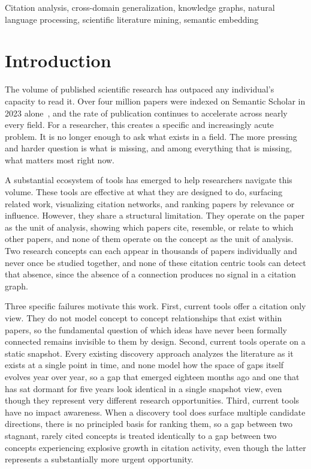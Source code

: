 \documentclass{ieeeaccess}
\begin{document}
\begin{keywords}
Citation analysis, cross-domain generalization, knowledge graphs, natural language processing, scientific literature mining, semantic embedding
\end{keywords}

\titlepgskip=-15pt

\maketitle

\section{Introduction}
\label{sec:introduction}


The volume of published scientific research has outpaced any individual's capacity to read it. Over four million papers were indexed on Semantic Scholar in 2023 alone~\cite{kinney2023semantic}, and the rate of publication continues to accelerate across nearly every field. For a researcher, this creates a specific and increasingly acute problem. It is no longer enough to ask what exists in a field. The more pressing and harder question is what is missing, and among everything that is missing, what matters most right now.

A substantial ecosystem of tools has emerged to help researchers navigate this volume. These tools are effective at what they are designed to do, surfacing related work, visualizing citation networks, and ranking papers by relevance or influence. However, they share a structural limitation. They operate on the paper as the unit of analysis, showing which papers cite, resemble, or relate to which other papers, and none of them operate on the concept as the unit of analysis. Two research concepts can each appear in thousands of papers individually and never once be studied together, and none of these citation centric tools can detect that absence, since the absence of a connection produces no signal in a citation graph.

Three specific failures motivate this work. First, current tools offer a citation only view. They do not model concept to concept relationships that exist within papers, so the fundamental question of which ideas have never been formally connected remains invisible to them by design. Second, current tools operate on a static snapshot. Every existing discovery approach analyzes the literature as it exists at a single point in time, and none model how the space of gaps itself evolves year over year, so a gap that emerged eighteen months ago and one that has sat dormant for five years look identical in a single snapshot view, even though they represent very different research opportunities. Third, current tools have no impact awareness. When a discovery tool does surface multiple candidate directions, there is no principled basis for ranking them, so a gap between two stagnant, rarely cited concepts is treated identically to a gap between two concepts experiencing explosive growth in citation activity, even though the latter represents a substantially more urgent opportunity.
\end{document}

